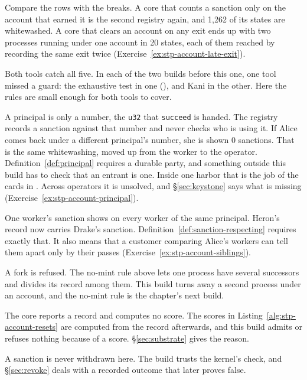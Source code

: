 Compare the rows with the breaks. A core that counts a sanction only on
the account that earned it is the second registry again, and 1,262 of its
states are whitewashed. A core that clears an account on any exit ends up
with two processes running under one account in 20 states, each of them
reached by recording the same exit twice
(Exercise~\ref{ex:stp-account-late-exit}).

Both tools catch all five. In each of the two builds before this one, one
tool missed a guard: the exhaustive test in one
(), and Kani in the other.
Here the rules are small enough for both tools to cover.


\begin{pdboundary}
\setlength{\parskip}{4pt plus 1pt}
A principal is only a number, the \texttt{u32} that \texttt{succeed} is
handed. The registry records a sanction against that number and never
checks who is using it. If Alice comes back under a different principal's
number, she is shown 0 sanctions. That is the same whitewashing, moved up
from the worker to the operator. Definition~\ref{def:principal} requires
a durable party, and something outside this build has to check that an
entrant is one. Inside one harbor that is the job of the cards in
. Across operators it is unsolved,
and \S\ref{sec:keystone} says what is missing
(Exercise~\ref{ex:stp-account-principal}).

One worker's sanction shows on every worker of the same principal.
Heron's record now carries Drake's sanction.
Definition~\ref{def:sanction-respecting} requires exactly that. It also
means that a customer comparing Alice's workers can tell them apart only
by their passes (Exercise~\ref{ex:stp-account-siblings}).

A fork is refused. The no-mint rule above lets one process have several
successors and divides its record among them. This build turns away a
second process under an account, and the no-mint rule is the chapter's
next build.

The core reports a record and computes no score. The scores in
Listing~\ref{alg:stp-account-resets} are computed from the record
afterwards, and this build admits or refuses nothing because of a score.
\S\ref{sec:substrate} gives the reason.

A sanction is never withdrawn here. The build trusts the kernel's check,
and \S\ref{sec:revoke} deals with a recorded outcome that later proves
false.
\end{pdboundary}
